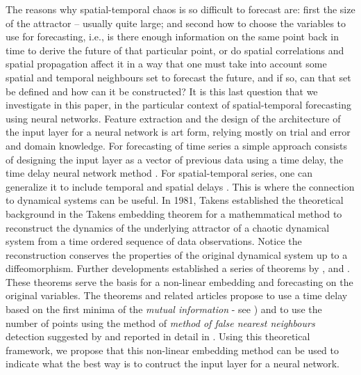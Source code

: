 \documentclass[journal]{IEEEtran}
\begin{document}
The reasons why spatial-temporal chaos
is so difficult to forecast are: first the size of the attractor -- usually quite large; and second how to choose
the variables to use for forecasting, i.e., is there enough information on the same point back in time to derive the future of that
particular point, or do spatial correlations and spatial propagation affect it in a way that one must take into account some
spatial and temporal neighbours set to forecast the future, and if so, can that set be defined and how can it be constructed?
It is this last question that we investigate in this paper, in the particular context of spatial-temporal forecasting using neural networks. Feature extraction and the design of the architecture of the input layer for a neural network is art form, relying mostly
on trial and error and domain knowledge. For forecasting of time series a simple approach consists
of designing the input layer as a vector of previous data using a time delay, the
time delay neural network method \cite{Waibel:1990:PRU:108235.108263, luk2000study, Frank2001, OH2002249, 1009-1963-12-6-304,
inputlayer}. For spatial-temporal series, one can generalize it to include temporal and spatial delays \cite{covas2016,covaspeixinhojoao}.
This is where the connection to dynamical systems can be useful.
In 1981, Takens established the theoretical background \cite{1981LNM...898..366T} in the Takens embedding theorem
for a mathemmatical method to reconstruct the dynamics of the underlying attractor of a chaotic dynamical system
from a time ordered sequence of data observations. Notice the reconstruction conserves the properties of the
original dynamical system up to a diffeomorphism.
 Further developments established a
series of  theorems by \cite{key1503303m}, \cite{1981LNM...898..366T, 1981LNM...898..230M} and \cite{1991JSP....65..579S}.
These theorems serve the basis for a non-linear embedding and forecasting on the original variables.
The theorems and related articles propose to use a time delay based on the first minima of the {\em mutual information} - see
\cite{Fraser86, abarbanel1997analysis, opac-b1092652}) and to use the number of points using
 the method of {\em method of false nearest neighbours} detection suggested by
\cite{1992PhRvA..45.3403K} and reported in detail in
\cite{1992PhRvA..45.7058M, 1993RvMP...65.1331A, 1996PhT....49k..86A, abarbanel1997analysis}.
Using this theoretical framework, we propose that this non-linear embedding method can be used to indicate
what the best way is to contruct the input layer for a neural network.
\end{document}
